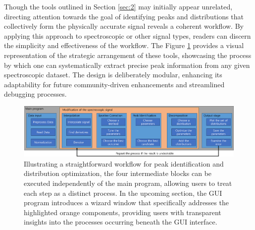 \documentclass{article}
\begin{document}
Though the tools outlined in Section \ref{sec:2} may initially appear unrelated, directing attention towards the goal of identifying peaks and distributions that collectively form the physically accurate signal reveals a coherent workflow.
By applying this approach to spectroscopic or other signal types, readers can discern the simplicity and effectiveness of the workflow.
The Figure \ref{fig:workflow} provides a visual representation of the strategic arrangement of these tools, showcasing the process by which one can systematically extract precise peak information from any given spectroscopic dataset.
The design is deliberately modular, enhancing its adaptability for future community-driven enhancements and streamlined debugging processes.
\begin{figure}[hbt!]
    \includegraphics[width=\linewidth]{workflow.png}
    \caption{Illustrating a straightforward workflow for peak identification and distribution optimization, the four intermediate blocks can be executed independently of the main program, allowing users to treat each step as a distinct process. In the upcoming section, the GUI program introduces a wizard window that specifically addresses the highlighted orange components, providing users with transparent insights into the processes occurring beneath the GUI interface.}
    \label{fig:workflow}
\end{figure}
%
%
\end{document}
